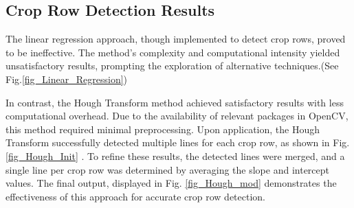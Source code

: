 \documentclass[conference]{IEEEtran}
\begin{document}
	\subsection{Crop Row Detection Results}
	
	The linear regression approach, though implemented to detect crop rows, proved to be ineffective. The method's complexity and computational intensity yielded unsatisfactory results, prompting the exploration of alternative techniques.(See Fig.\ref{fig_Linear_Regression})
	
	In contrast, the Hough Transform method achieved satisfactory results with less computational overhead. Due to the availability of relevant packages in OpenCV, this method required minimal preprocessing. Upon application, the Hough Transform successfully detected multiple lines for each crop row, as shown in Fig. 
	\ref{fig_Hough_Init}
	. To refine these results, the detected lines were merged, and a single line per crop row was determined by averaging the slope and intercept values. The final output, displayed in Fig. 
	\ref{fig_Hough_mod} demonstrates the effectiveness of this approach for accurate crop row detection.
	
\end{document}
